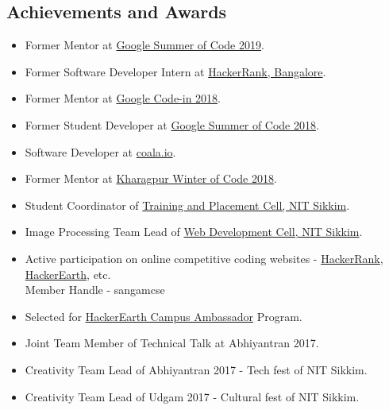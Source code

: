 \documentclass[margin, centered]{res}
\begin{document}
\begin{resume}
        \section{Achievements and Awards}
            \begin{itemize}[leftmargin=*]
                \item Former Mentor at \href{https://summerofcode.withgoogle.com/}{Google Summer of Code 2019}.
                \item Former Software Developer Intern at \href{https://www.hackerrank.com}{HackerRank, Bangalore}.
                \item Former Mentor at \href{https://codein.withgoogle.com}{Google Code-in 2018}.
                \item Former Student Developer at \href{https://summerofcode.withgoogle.com/}{Google Summer of Code 2018}.
                \item Software Developer at \href{https://coala.io}{coala.io}.
                \item Former Mentor at \href{https://kwoc.kossiitkgp.org/}{Kharagpur Winter of Code 2018}.
                \item Student Coordinator of \href{http://placement.nitsikkim.ac.in/}{Training and Placement Cell, NIT Sikkim}.
                \item Image Processing Team Lead of \href{https://nitsikkim.ac.in/webdevelopmentcell}{Web Development Cell, NIT Sikkim}.
                \item Active participation on online competitive coding websites - \href{https://www.hackerrank.com/sangamcse}{HackerRank},
                    \href{https://www.hackerearth.com/@damonsangam}{HackerEarth}, etc. \\
                    Member Handle - sangamcse
                \item Selected for \href{https://www.hackerearth.com/university}{HackerEarth Campus Ambassador} Program.
                \item Joint Team Member of Technical Talk at Abhiyantran 2017.
                \item Creativity Team Lead of Abhiyantran 2017 - Tech fest of NIT Sikkim.
                \item Creativity Team Lead of Udgam 2017 - Cultural fest of NIT Sikkim.
            \end{itemize}


\end{resume}
\end{document}

